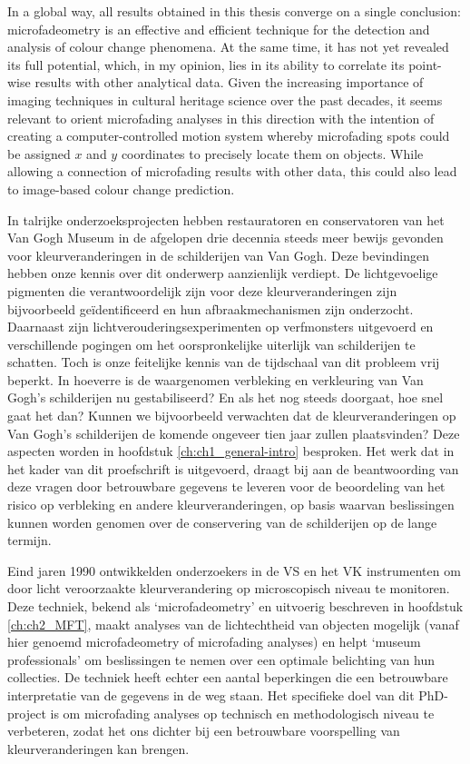 In a global way, all results obtained in this thesis converge on a single conclusion: microfadeometry is an effective and efficient technique for the detection and analysis of colour change phenomena. At the same time, it has not yet revealed its full potential, which, in my opinion, lies in its ability to correlate its point-wise results with other analytical data. Given the increasing importance of imaging techniques in cultural heritage science over the past decades, it seems relevant to orient microfading analyses in this direction with the intention of creating a computer-controlled motion system whereby microfading spots could be assigned $x$ and $y$ coordinates to precisely locate them on objects. While allowing a connection of microfading results with other data, this could also lead to image-based colour change prediction.



In talrijke onderzoeksprojecten hebben restauratoren en conservatoren van het Van Gogh Museum in de afgelopen drie decennia steeds meer bewijs gevonden voor kleurveranderingen in de schilderijen van Van Gogh. Deze bevindingen hebben onze kennis over dit onderwerp aanzienlijk verdiept. De lichtgevoelige pigmenten die verantwoordelijk zijn voor deze kleurveranderingen zijn bijvoorbeeld geïdentificeerd en hun afbraakmechanismen zijn onderzocht. Daarnaast zijn lichtverouderingsexperimenten op verfmonsters uitgevoerd en verschillende pogingen om het oorspronkelijke uiterlijk van schilderijen te schatten. Toch is onze feitelijke kennis van de tijdschaal van dit probleem vrij beperkt. In hoeverre is de waargenomen verbleking en verkleuring van Van Gogh's schilderijen nu gestabiliseerd? En als het nog steeds doorgaat, hoe snel gaat het dan? Kunnen we bijvoorbeeld verwachten dat de kleurveranderingen op Van Gogh's schilderijen de komende ongeveer tien jaar zullen plaatsvinden? Deze aspecten worden in hoofdstuk \ref{ch:ch1_general-intro} besproken. Het werk dat in het kader van dit proefschrift is uitgevoerd, draagt bij aan de beantwoording van deze vragen door betrouwbare gegevens te leveren voor de beoordeling van het risico op verbleking en andere kleurveranderingen, op basis waarvan beslissingen kunnen worden genomen over de conservering van de schilderijen op de lange termijn.



Eind jaren 1990 ontwikkelden onderzoekers in de VS en het VK instrumenten om door licht veroorzaakte kleurverandering op microscopisch niveau te monitoren. Deze techniek, bekend als ‘microfadeometry’ en uitvoerig beschreven in hoofdstuk \ref{ch:ch2_MFT}, maakt analyses van de lichtechtheid van objecten mogelijk (vanaf hier genoemd microfadeometry of microfading analyses) en helpt ‘museum professionals’ om beslissingen te nemen over een optimale belichting van hun collecties. De techniek heeft echter een aantal beperkingen die een betrouwbare interpretatie van de gegevens in de weg staan. Het specifieke doel van dit PhD-project is om microfading analyses op technisch en methodologisch niveau te verbeteren, zodat het ons dichter bij een betrouwbare voorspelling van kleurveranderingen kan brengen. 

